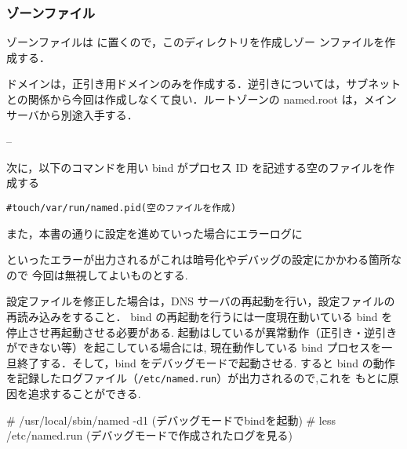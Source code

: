 \subsubsection*{ゾーンファイル}

ゾーンファイルは  に置くので，このディレクトリを作成しゾー
ンファイルを作成する．

ドメインは，正引き用ドメインのみを作成する．逆引きについては，サブネット
との関係から今回は作成しなくて良い．ルートゾーンの named.root は，メイン
サーバから別途入手する．

--

次に，以下のコマンドを用い bind がプロセス ID を記述する空のファイルを作成する
\begin{center}
\begin{breakbox}
\begin{alltt}
# touch /var/run/named.pid (空のファイルを作成)
\end{alltt}
\end{breakbox}
\end{center}

また，本書の通りに設定を進めていった場合にエラーログに
といったエラーが出力されるがこれは暗号化やデバッグの設定にかかわる箇所なので
今回は無視してよいものとする.

設定ファイルを修正した場合は，DNS サーバの再起動を行い，設定ファイルの再読み込みをすること．
bind の再起動を行うには一度現在動いている bind を停止させ再起動させる必要がある.
起動はしているが異常動作（正引き・逆引きができない等）を起こしている場合には,
現在動作している bind プロセスを一旦終了する．そして，bind をデバッグモードで起動させる.
すると bind の動作を記録したログファイル（\texttt{/etc/named.run}）が出力されるので,これを
もとに原因を追求することができる.
\begin{cli}
# /usr/local/sbin/named -d1   (デバッグモードでbindを起動)
# less /etc/named.run         (デバッグモードで作成されたログを見る)
\end{cli}

